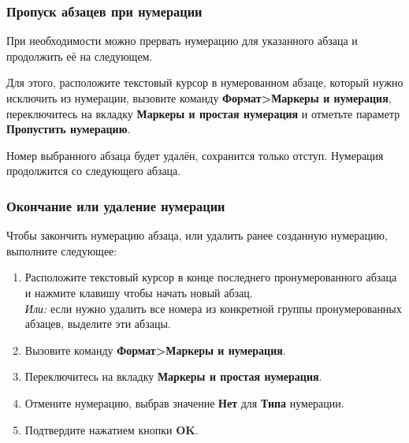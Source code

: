 ﻿\documentclass[a4paper,10pt]{article}
\begin{document}
\subsubsection{Пропуск абзацев при нумерации}
При необходимости можно прервать нумерацию для указанного абзаца и продолжить её на следующем.

Для этого, расположите текстовый курсор в нумерованном абзаце, который нужно исключить из нумерации, вызовите команду \textbf{Формат>Маркеры и нумерация}, 
переключитесь на вкладку \textbf{Маркеры и простая нумерация} и отметьте параметр \textbf{Пропустить нумерацию}.

Номер выбранного абзаца будет удалён, сохранится только отступ. Нумерация продолжится со следующего абзаца.

\subsubsection{Окончание или удаление нумерации}
Чтобы закончить нумерацию абзаца, или удалить ранее созданную нумерацию, выполните следующее:
\begin{enumerate}
 \item Расположите текстовый курсор в конце последнего пронумерованного абзаца и нажмите клавишу  чтобы начать новый абзац.\\
 \textit{Или:} если нужно удалить все номера из конкретной группы пронумерованных абзацев, выделите эти абзацы.
 \item Вызовите команду \textbf{Формат>Маркеры и нумерация}.
 \item Переключитесь на вкладку \textbf{Маркеры и простая нумерация}.
 \item Отмените нумерацию, выбрав значение \textbf{Нет} для \textbf{Типа} нумерации.
 \item Подтвердите нажатием кнопки \textbf{OK}. 
\end{enumerate}
\end{document}
